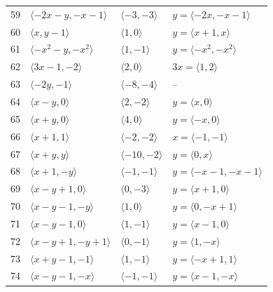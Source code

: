 \documentclass[11pt]{article}
\begin{document}
\begin{longtable}{@{}rlll@{}}
59 & $\langle -2x-y,-x-1\rangle$ & $\langle -3,-3\rangle$ & $y=\langle -2x,-x-1\rangle$\\
60 & $\langle x,y-1\rangle$ & $\langle 1,0\rangle$ & $y=\langle x+1,x\rangle$\\
61 & $\langle -x^{2}-y,-x^{2}\rangle$ & $\langle 1,-1\rangle$ & $y=\langle -x^{2},-x^{2}\rangle$\\
62 & $\langle 3x-1,-2\rangle$ & $\langle 2,0\rangle$ & $3x=\langle 1,2\rangle$\\
63 & $\langle -2y,-1\rangle$ & $\langle -8,-4\rangle$ & --\\
64 & $\langle x-y,0\rangle$ & $\langle 2,-2\rangle$ & $y=\langle x,0\rangle$\\
65 & $\langle x+y,0\rangle$ & $\langle 4,0\rangle$ & $y=\langle -x,0\rangle$\\
66 & $\langle x+1,1\rangle$ & $\langle -2,-2\rangle$ & $x=\langle -1,-1\rangle$\\
67 & $\langle x+y,y\rangle$ & $\langle -10,-2\rangle$ & $y=\langle 0,x\rangle$\\
68 & $\langle x+1,-y\rangle$ & $\langle -1,-1\rangle$ & $y=\langle -x-1,-x-1\rangle$\\
69 & $\langle x-y+1,0\rangle$ & $\langle 0,-3\rangle$ & $y=\langle x+1,0\rangle$\\
70 & $\langle x-y-1,-y\rangle$ & $\langle 1,0\rangle$ & $y=\langle 0,-x+1\rangle$\\
71 & $\langle x-y-1,0\rangle$ & $\langle 1,-1\rangle$ & $y=\langle x-1,0\rangle$\\
72 & $\langle x-y+1,-y+1\rangle$ & $\langle 0,-1\rangle$ & $y=\langle 1,-x\rangle$\\
73 & $\langle x+y-1,-1\rangle$ & $\langle 1,-1\rangle$ & $y=\langle -x+1,1\rangle$\\
74 & $\langle x-y-1,-x\rangle$ & $\langle -1,-1\rangle$ & $y=\langle x-1,-x\rangle$\\
\end{longtable}
\endgroup
\end{document}

